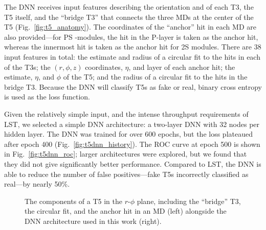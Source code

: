 The DNN receives input features describing the orientation and \pt of each T3, the T5 itself, and the ``bridge T3'' that connects the three MDs at the center of the T5 (Fig.~\ref{fig:t5_anatomy}). 
The coordinates of the ``anchor'' hit in each MD are also provided---for PS \pt-modules, the hit in the P-layer is taken as the anchor hit, whereas the innermost hit is taken as the anchor hit for 2S modules. 
There are 38 input features in total: the \pt estimate and radius of a circular fit to the hits in each of the T3s; 
the $(r, \phi, z)$ coordinates, $\eta$, and layer of each anchor hit; 
the \pt estimate, $\eta$, and $\phi$ of the T5; 
and the radius of a circular fit to the hits in the bridge T3. 
Because the DNN will classify T5s as fake or real, binary cross entropy is used as the loss function. 

Given the relatively simple input, and the intense throughput requirements of LST, we selected a simple DNN architecture: a two-layer DNN with 32 nodes per hidden layer. 
The DNN was trained for over 600 epochs, but the loss plateaued after epoch 400 (Fig.~\ref{fig:t5dnn_history}). 
The ROC curve at epoch 500 is shown in Fig.~\ref{fig:t5dnn_roc}; larger architectures were explored, but we found that they did not give significantly better performance. 
Compared to LST, the DNN is able to reduce the number of false positives---fake T5s incorrectly classified as real---by nearly 50\%. 

\begin{figure}[!htb]
    \centering
    \qquad
    \caption[The components of a T5 and the DNN architecture.]{
        The components of a T5 in the $r$-$\phi$ plane, including the ``bridge'' T3, the circular fit, and the anchor hit in an MD (left) alongside the DNN architecture used in this work (right). 
    }
\end{figure}

